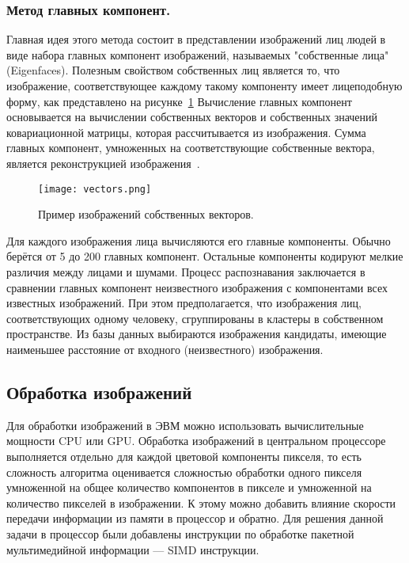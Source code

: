 \subsubsection{Метод главных компонент. }
\label{sub:domain:face_detect:main_component_method}
Главная идея этого метода состоит в представлении изображений лиц людей в виде набора главных компонент изображений, называемых "собственные лица" (Eigenfaces). Полезным свойством собственных лиц является то, что изображение, соответствующее каждому такому компоненту имеет лицеподобную форму, как представлено на рисунке~\ref{fig:vectors} Вычисление главных компонент основывается на вычислении собственных векторов и собственных значений ковариационной матрицы, которая рассчитывается из изображения. Сумма главных компонент, умноженных на соответствующие собственные вектора, является реконструкцией изображения~\cite{fd_2012}.
\begin{figure}[ht]
\centering
    \centering
    \texttt{[image: vectors.png]}  
  \caption{Пример изображений собственных векторов.}
  \label{fig:vectors}
\end{figure}

Для каждого изображения лица вычисляются его главные компоненты. Обычно берётся от 5 до 200 главных компонент. Остальные компоненты кодируют мелкие различия между лицами и шумами. Процесс распознавания заключается в сравнении главных компонент неизвестного изображения с компонентами всех известных изображений. При этом предполагается, что изображения лиц, соответствующих одному человеку, сгруппированы в кластеры в собственном пространстве. Из базы данных выбираются изображения кандидаты, имеющие наименьшее расстояние от входного (неизвестного) изображения.


\subsection{Обработка изображений}
\label{sub:domain:img_proc}

Для обработки изображений в ЭВМ можно использовать вычислительные мощности CPU или GPU. Обработка изображений в центральном процессоре выполняется отдельно для каждой цветовой компоненты пикселя, то есть сложность алгоритма оценивается сложностью обработки одного пикселя умноженной на общее количество компонентов в пикселе и умноженной на количество пикселей в изображении. К этому можно добавить влияние скорости передачи информации из памяти в процессор и обратно. Для решения данной задачи в процессор были добавлены инструкции по обработке пакетной мультимедийной информации --- SIMD инструкции.

